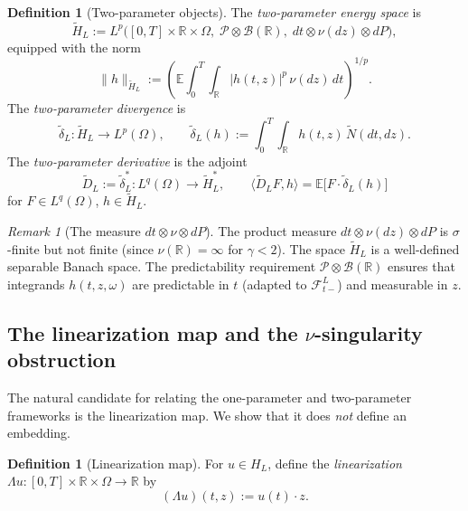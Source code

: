 \documentclass[11pt,a4paper]{article}
\theoremstyle{plain}
\theoremstyle{definition}
\newtheorem{definition}[theorem]{Definition}
\theoremstyle{remark}
\newtheorem{remark}[theorem]{Remark}
\newcommand{\E}{\mathbb{E}}
\newcommand{\R}{\mathbb{R}}
\begin{document}
\begin{definition}[Two-parameter objects]\label{def:two-param}
The \emph{two-parameter energy space} is
\begin{equation}\label{eq:tHL}
  \widetilde{H}_L :=
  L^p\bigl([0,T]\times\R\times\Omega,\;
  \mathcal{P}\otimes\mathcal{B}(\R),\;
  dt\otimes\nu(dz)\otimes dP\bigr),
\end{equation}
equipped with the norm
\begin{equation}\label{eq:tHL-norm}
  \|h\|_{\widetilde{H}_L}
  := \left(\E\!\int_0^T\!\!\int_{\R}
  |h(t,z)|^p\,\nu(dz)\,dt\right)^{1/p}.
\end{equation}
The \emph{two-parameter divergence} is
\begin{equation}\label{eq:tdelta}
  \widetilde{\delta}_L : \widetilde{H}_L \to L^p(\Omega),
  \qquad
  \widetilde{\delta}_L(h) :=
  \int_0^T\!\!\int_{\R} h(t,z)\,\widetilde{N}(dt,dz).
\end{equation}
The \emph{two-parameter derivative} is the adjoint
\begin{equation}\label{eq:tDL}
  \widetilde{D}_L := \widetilde{\delta}_L^* :
  L^q(\Omega) \to \widetilde{H}_L^*,
  \qquad
  \langle \widetilde{D}_L F, h \rangle
  = \E\bigl[F \cdot \widetilde{\delta}_L(h)\bigr]
\end{equation}
for $F \in L^q(\Omega)$,
$h \in \widetilde{H}_L$.
\end{definition}

\begin{remark}[The measure $dt\otimes\nu\otimes dP$]
\label{rem:measure}
The product measure $dt\otimes\nu(dz)\otimes dP$ is
$\sigma$-finite but not finite (since $\nu(\R) = \infty$
for $\gamma < 2$).  The space $\widetilde{H}_L$ is a
well-defined separable Banach space.  The predictability
requirement $\mathcal{P}\otimes\mathcal{B}(\R)$ ensures
that integrands $h(t,z,\omega)$ are predictable in $t$
(adapted to $\mathcal{F}_{t-}^L$) and measurable in $z$.
\end{remark}


\subsection{The linearization map and the $\nu$-singularity obstruction}

The natural candidate for relating the one-parameter and
two-parameter frameworks is the linearization map.  We show
that it does \emph{not} define an embedding.

\begin{definition}[Linearization map]\label{def:linearization}
For $u \in H_L$, define the \emph{linearization}
$\Lambda u : [0,T]\times\R\times\Omega \to \R$ by
\begin{equation}\label{eq:Lambda}
  (\Lambda u)(t,z) := u(t) \cdot z.
\end{equation}
\end{definition}
\end{document}
